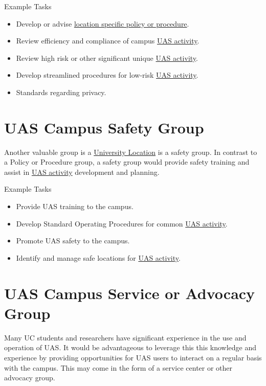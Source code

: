 \documentclass[
]{book}
\providecommand{\tightlist}{%
  \setlength{\itemsep}{0pt}\setlength{\parskip}{0pt}}
\begin{document}
Example Tasks

\begin{itemize}
\tightlist
\item
  Develop or advise \protect\hyperlink{LSP}{location specific policy or procedure}.
\item
  Review efficiency and compliance of campus \protect\hyperlink{UASactivity}{UAS activity}.
\item
  Review high risk or other significant unique \protect\hyperlink{UASactivity}{UAS activity}.
\item
  Develop streamlined procedures for low-risk \protect\hyperlink{UASactivity}{UAS activity}.
\item
  Standards regarding privacy.
\end{itemize}

\hypertarget{uas-campus-safety-group}{%
\section{UAS Campus Safety Group}\label{uas-campus-safety-group}}

Another valuable group is a \protect\hyperlink{UL}{University Location} is a safety group. In contrast to a Policy or Procedure group, a safety group would provide safety training and assist in \protect\hyperlink{UASactivity}{UAS activity} development and planning.

Example Tasks

\begin{itemize}
\tightlist
\item
  Provide UAS training to the campus.
\item
  Develop Standard Operating Procedures for common \protect\hyperlink{UASactivity}{UAS activity}.
\item
  Promote UAS safety to the campus.
\item
  Identify and manage safe locations for \protect\hyperlink{UASactivity}{UAS activity}.
\end{itemize}

\hypertarget{uas-campus-service-or-advocacy-group}{%
\section{UAS Campus Service or Advocacy Group}\label{uas-campus-service-or-advocacy-group}}

Many UC students and researchers have significant experience in the use and operation of UAS. It would be advantageous to leverage this this knowledge and experience by providing opportunities for UAS users to interact on a regular basis with the campus. This may come in the form of a service center or other advocacy group.
\end{document}
